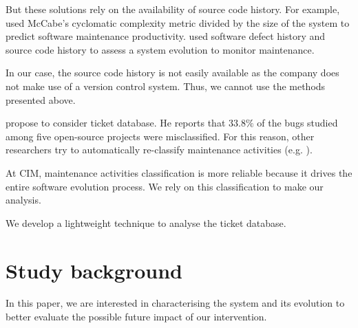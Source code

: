 \documentclass[10pt,conference]{IEEEtran}
\begin{document}

But these solutions rely on the availability of source code history. 
For example, \cite{gill91} used McCabe’s cyclomatic complexity metric divided by the size of the system to predict software maintenance productivity.
\cite{port18,Zhan10a} used software defect history and source code history to assess a system evolution to monitor maintenance. 

In our case, the source code history is not easily available as the company does not make use of a version control system.
Thus, we cannot use the methods presented above.

\cite{Herz13a} propose to consider ticket database.
He reports that $33.8\%$ of the bugs studied among five open-source projects were misclassified.
For this reason, other researchers try to automatically re-classify maintenance activities (e.g. \cite{Mock20a,Levin19a}).
 
At CIM, maintenance activities classification is more reliable because it drives the entire software evolution process.
We rely on this classification to make our analysis.

We develop a lightweight technique to analyse the ticket database.


\section{Study background}
\label{sec:background}

In this paper, we are interested in characterising the system and its evolution to better evaluate the possible future impact of our intervention. 
\end{document}
